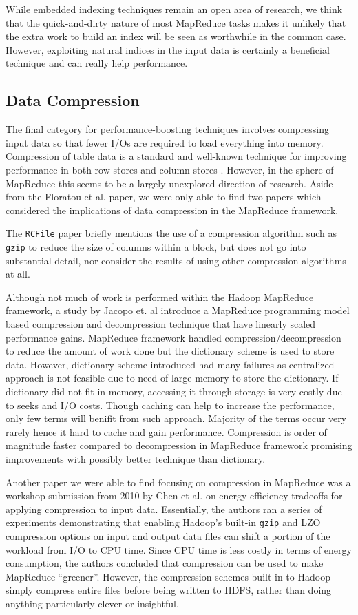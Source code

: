 \documentclass[twocolumn]{article}
\begin{document}
While embedded indexing techniques remain an open area of research, we think
that the quick-and-dirty nature of most MapReduce tasks makes it
unlikely that the extra work to build an index will be seen as worthwhile
in the common case.  However, exploiting natural indices in the input
data is certainly a beneficial technique and can really help performance.

\subsection{Data Compression}

The final category for performance-boosting techniques involves compressing
input data so that fewer I/Os are required to load everything into memory.
Compression of table data is a standard and well-known technique for
improving performance in both row-stores and column-stores \cite{ref:colstore-comp}.
However, in the sphere of MapReduce this seems to be a largely unexplored
direction of research.  Aside from the Floratou et al. paper, we were
only able to find two papers which considered the implications of data
compression in the MapReduce framework.

The \verb+RCFile+ paper briefly mentions the use of a compression algorithm
such as \verb+gzip+ to reduce the size of columns within a block, but does
not go into substantial detail, nor consider the results of using other
compression algorithms at all.


Although not much of work is performed within the Hadoop MapReduce framework,
a study by Jacopo et. al \cite{ref:web-compression} introduce a MapReduce programming 
model based compression and decompression technique that have linearly scaled 
performance gains. MapReduce framework handled compression/decompression to reduce
the amount of work done but the dictionary scheme is used to store data. However, 
dictionary scheme introduced had many failures as centralized approach is not 
feasible due to need of large memory to store the dictionary. If dictionary did not 
fit in memory, accessing it through storage is very costly due to seeks and I/O costs.
Though caching can help to increase the performance, only few terms will benifit from 
such approach. Majority of the terms occur very rarely hence it hard to cache and 
gain performance. Compression is order of magnitude faster compared to decompression 
in MapReduce framework promising improvements with possibly better technique than
dictionary.

Another paper we were able to find focusing on compression in MapReduce
was a workshop submission from 2010 by Chen et al. \cite{ref:energy} on
energy-efficiency tradeoffs for applying compression to input data.
Essentially, the authors ran a series of experiments demonstrating that
enabling Hadoop's built-in \verb+gzip+ and LZO compression options
on input and output data files can shift a portion of the workload
from I/O to CPU time.  Since CPU time is less costly in terms of energy
consumption, the authors concluded that compression can be used to make
MapReduce ``greener''.  However, the compression schemes built in to 
Hadoop simply compress entire files before being written to HDFS, rather
than doing anything particularly clever or insightful.
\end{document}
